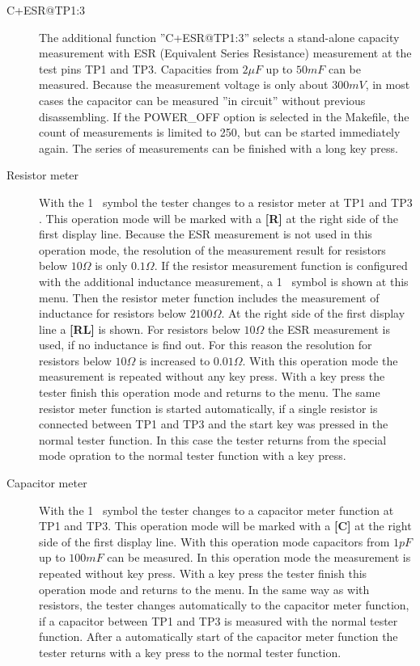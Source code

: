 \begin{description}
\item[C+ESR@TP1:3]
The additional function ''C+ESR@TP1:3'' selects a stand-alone capacity measurement with 
ESR (Equivalent Series Resistance) measurement at the test pins TP1 and TP3. 
Capacities from \(2\mu F\) up to \(50mF\) can be measured. 
Because the measurement voltage is only about \(300mV\), in most cases the capacitor can be
measured ''in circuit'' without previous disassembling.
If the POWER\_OFF option is selected in the Makefile, the count of measurements is limited
to 250, but can be started immediately again.
The series of measurements can be finished with a long key press.\\

 \item[Resistor meter]
With the \mbox{1 } symbol the tester changes to a resistor meter at TP1 and TP3 . 
This operation mode will be marked with a {\bf[R]} at the right side of the first display line.
Because the ESR measurement is not used in this operation mode, the resolution of the measurement
result for resistors below \(10\Omega\) is only \(0.1\Omega\).
If the resistor measurement function is configured with the additional inductance measurement,
a \mbox{1 \electricR {}} symbol is shown at this menu.
Then the resistor meter function includes the measurement of inductance for resistors below \(2100\Omega\).
At the right side of the first display line a {\bf[RL]} is shown.
For resistors below \(10\Omega\) the ESR measurement is used,
if no inductance is find out. For this reason the resolution for resistors below \(10\Omega\) 
is increased to \(0.01\Omega\).
With this operation mode the measurement is repeated without any key press.
With a key press the tester finish this operation mode and returns to the menu.
The same resistor meter function is started automatically, if a single resistor is connected between TP1 and TP3
and the start key was pressed in the normal tester function. In this case the tester returns
from the special mode opration to the normal tester function with a key press.

 \item[Capacitor meter]
With the \mbox{1 } symbol the tester changes to a capacitor meter function at TP1 and TP3.
This operation mode will be marked with a {\bf[C]} at the right side of the first display line.
With this operation mode capacitors from \(1pF\) up to \(100mF\) can be measured.
In this operation mode the measurement is repeated without key press.
With a key press the tester finish this operation mode and returns to the menu.
In the same way as with resistors, the tester changes automatically to the capacitor meter function,
if a capacitor between TP1 and TP3 is measured with the normal tester function.
After a automatically start of the capacitor meter function the tester returns with a key press to
the normal tester function.


\end{description}
